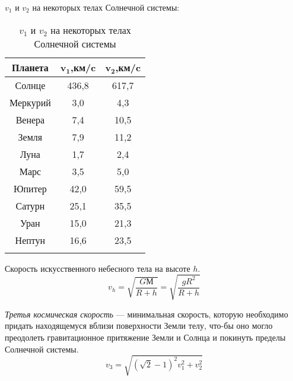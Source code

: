 $v_1$ и $v_2$ на некоторых телах Солнечной системы:
\begin{table}[h!]
\centering
\begin{tabular}{|c|c|c|}
\hline
\textbf{Планета} & $\mathbf{v_1}$,\textbf{км/c} & $\mathbf{v_2}$,\textbf{км/c}\\
\hline
Солнце & 436,8 & 617,7\\
\hline
Меркурий & 3,0 & 4,3\\
\hline
Венера & 7,4 & 10,5\\
\hline
Земля & 7,9 & 11,2\\
\hline
Луна & 1,7 & 2,4\\
\hline
Марс & 3,5 & 5,0\\
\hline
Юпитер & 42,0 & 59,5\\
\hline
Сатурн & 25,1 & 35,5\\
\hline
Уран & 15,0 & 21,3\\
\hline
Нептун & 16,6 & 23,5\\
\hline
\caption{$v_1$ и $v_2$ на некоторых телах Солнечной системы}
\end{tabular}
\end{table}

Скорость искусственного небесного тела на высоте $h$.\begin{equation}v_h=\sqrt{\frac{GМ}{R+h}}=\sqrt{\frac{gR^2}{R+h}}
\end{equation}

\textit{Третья космическая скорость} --- минимальная скорость, которую необходимо придать находящемуся вблизи поверхности Земли телу, что-бы оно могло преодолеть гравитационное притяжение Земли и Солнца и покинуть пределы Солнечной системы.
\begin{equation}v_3=\sqrt{(\sqrt{2}-1)^2v^2_1+v^2_2}
\end{equation} 

